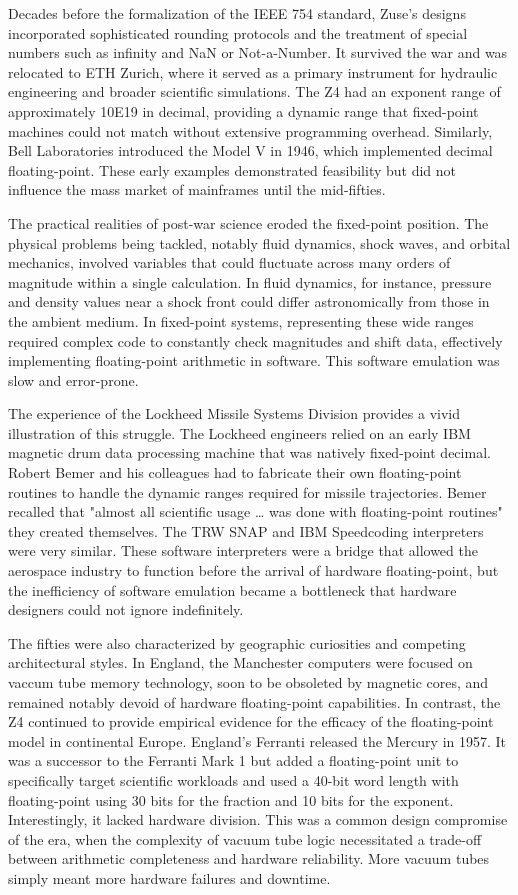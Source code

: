 Decades before the formalization of the IEEE 754 standard, Zuse’s designs incorporated sophisticated rounding protocols and the treatment of special numbers such as infinity and NaN or Not-a-Number. It survived the war and was relocated to ETH Zurich, where it served as a primary instrument for hydraulic engineering and broader scientific simulations. The Z4 had an exponent range of approximately 10E19 in decimal, providing a dynamic range that fixed-point machines could not match without extensive programming overhead. Similarly, Bell Laboratories introduced the Model V in 1946, which implemented decimal floating-point. These early examples demonstrated feasibility but did not influence the mass market of mainframes until the mid-fifties. 

The practical realities of post-war science eroded the fixed-point position. The physical problems being tackled, notably fluid dynamics, shock waves, and orbital mechanics, involved variables that could fluctuate across many orders of magnitude within a single calculation. In fluid dynamics, for instance, pressure and density values near a shock front could differ astronomically from those in the ambient medium. In fixed-point systems, representing these wide ranges required complex code to constantly check magnitudes and shift data, effectively implementing floating-point arithmetic in software. This software emulation was slow and error-prone. 

The experience of the Lockheed Missile Systems Division provides a vivid illustration of this struggle. The Lockheed engineers relied on an early IBM magnetic drum data processing machine that was natively fixed-point decimal. Robert Bemer and his colleagues had to fabricate their own floating-point routines to handle the dynamic ranges required for missile trajectories. Bemer recalled that "almost all scientific usage … was done with floating-point routines" they created themselves. The TRW SNAP and IBM Speedcoding interpreters were very similar. These software interpreters were a bridge that allowed the aerospace industry to function before the arrival of hardware floating-point, but the inefficiency of software emulation became a bottleneck that hardware designers could not ignore indefinitely. 

The fifties were also characterized by geographic curiosities and competing architectural styles. In England, the Manchester computers were focused on vaccum tube memory technology, soon to be obsoleted by magnetic cores, and remained notably devoid of hardware floating-point capabilities. In contrast, the Z4 continued to provide empirical evidence for the efficacy of the floating-point model in continental Europe. England’s Ferranti released the Mercury in 1957. It was a successor to the Ferranti Mark 1 but added a floating-point unit to specifically target scientific workloads and used a 40-bit word length with floating-point using 30 bits for the fraction and 10 bits for the exponent. Interestingly, it lacked hardware division. This was a common design compromise of the era, when the complexity of vacuum tube logic necessitated a trade-off between arithmetic completeness and hardware reliability. More vacuum tubes simply meant more hardware failures and downtime. 

